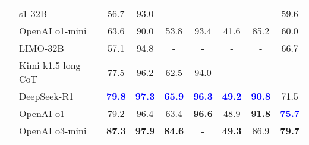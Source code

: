 \begin{table*}[htbp]
{\begin{tabular}{l|lccccccc}
  & s1-32B \cite{muennighoff2025s1} & 56.7 & 93.0 & - &- & - &- & 59.6 \\
  
 &\cellcolor[rgb]{ .949,  .949,  .949}OpenAI o1-mini \cite{o1-mini} & \cellcolor[rgb]{ .949,  .949,  .949}63.6 & \cellcolor[rgb]{ .949,  .949,  .949}90.0 &\cellcolor[rgb]{ .949,  .949,  .949} 53.8 & \cellcolor[rgb]{ .949,  .949,  .949}93.4 & \cellcolor[rgb]{ .949,  .949,  .949}41.6 & \cellcolor[rgb]{ .949,  .949,  .949}85.2 & \cellcolor[rgb]{ .949,  .949,  .949}60.0 \\
 
  & LIMO-32B \cite{ye2025limoreasoning} & 57.1 & 94.8 & - &- &- &- & 66.7 \\
  
& \cellcolor[rgb]{ .949,  .949,  .949}Kimi k1.5 long-CoT \cite{team2025kimi} & \cellcolor[rgb]{ .949,  .949,  .949}77.5 & \cellcolor[rgb]{ .949,  .949,  .949}96.2 & \cellcolor[rgb]{ .949,  .949,  .949}62.5 &\cellcolor[rgb]{ .949,  .949,  .949} 94.0 & \cellcolor[rgb]{ .949,  .949,  .949}- &\cellcolor[rgb]{ .949,  .949,  .949} - & \cellcolor[rgb]{ .949,  .949,  .949}- \\

   & DeepSeek-R1 \cite{Deepseek-R1} & \textcolor{blue}{\textbf{79.8}} & \textcolor{blue}{\textbf{97.3}} & \textcolor{blue}{\textbf{65.9}} & \textcolor{blue}{\textbf{96.3}} & \textcolor{blue}{\textbf{49.2}} & \textcolor{blue}{\textbf{90.8}} & 71.5 \\
   
&\cellcolor[rgb]{ .949,  .949,  .949}OpenAI-o1 \cite{openai_o1} & \cellcolor[rgb]{ .949,  .949,  .949}79.2 & \cellcolor[rgb]{ .949,  .949,  .949}96.4 & \cellcolor[rgb]{ .949,  .949,  .949}63.4 & \cellcolor[rgb]{ .949,  .949,  .949}\textcolor{deepred}{\textbf{96.6}} & \cellcolor[rgb]{ .949,  .949,  .949}48.9 & \cellcolor[rgb]{ .949,  .949,  .949}\textcolor{deepred}{\textbf{91.8}} & \cellcolor[rgb]{ .949,  .949,  .949}\textcolor{blue}{\textbf{75.7}} \\


 &OpenAI o3-mini \cite{o3-mini}  & \textcolor{deepred}{\textbf{87.3}} & \textcolor{deepred}{\textbf{97.9}} & \textcolor{deepred}{\textbf{84.6}} & - & \textcolor{deepred}{\textbf{49.3}} & 86.9 & \textcolor{deepred}{\textbf{79.7}} \\

\bottomrule[1.2pt]
\end{tabular}
}
\end{table*}







